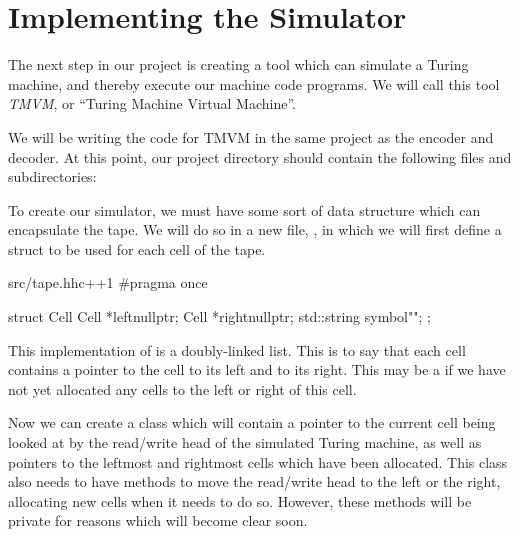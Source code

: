 \section{Implementing the Simulator}

The next step in our project is creating a tool which can simulate a Turing machine, and thereby execute our machine code programs. We will call this tool \textit{TMVM}, or ``Turing Machine Virtual Machine''.

We will be writing the code for TMVM in the same project as the encoder and decoder. At this point, our project directory should contain the following files and subdirectories:


To create our simulator, we must have some sort of data structure which can encapsulate the tape. We will do so in a new file, , in which we will first define a struct to be used for each cell of the tape.

\begin{file}{src/tape.hh}{c++}{1}
#pragma once

struct Cell
{
    Cell *left{nullptr};
    Cell *right{nullptr};
    std::string symbol{""};
};
\end{file}

This implementation of  is a doubly-linked list. This is to say that each cell contains a pointer to the cell to its left and to its right. This may be a  if we have not yet allocated any cells to the left or right of this cell.

Now we can create a  class which will contain a pointer to the current cell being looked at by the read/write head of the simulated Turing machine, as well as pointers to the leftmost and rightmost cells which have been allocated. This class also needs to have methods to move the read/write head to the left or the right, allocating new cells when it needs to do so. However, these methods will be private for reasons which will become clear soon.

\begin{file}{src/tape.hh}{c++}{10}
class Tape
{
private:
    Cell *m_current;
    Cell *m_leftmost;
    Cell *m_rightmost;

    void moveLeft(void);
    void moveRight(void);
\end{file}

